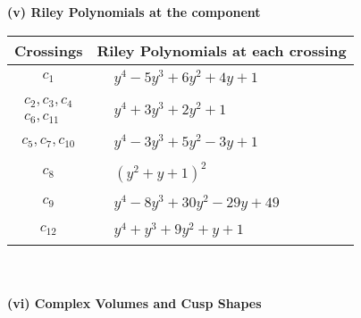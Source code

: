 \documentclass[1p]{elsarticle_modified}
\theoremstyle{definition}
\begin{document}
\newpage\renewcommand{\arraystretch}{1}
\flushleft \textbf{(v) Riley Polynomials at the component}\newline \\
\begin{tabular}{m{50pt}|m{274pt}}
Crossings & \hspace{64pt}Riley Polynomials at each crossing \\
\hline $$\begin{aligned}c_{1}\end{aligned}$$&$\begin{aligned}
&y^4-5 y^3+6 y^2+4 y+1
\end{aligned}$\\
\hline $$\begin{aligned}c_{2},c_{3},c_{4}\\c_{6},c_{11}\end{aligned}$$&$\begin{aligned}
&y^4+3 y^3+2 y^2+1
\end{aligned}$\\
\hline $$\begin{aligned}c_{5},c_{7},c_{10}\end{aligned}$$&$\begin{aligned}
&y^4-3 y^3+5 y^2-3 y+1
\end{aligned}$\\
\hline $$\begin{aligned}c_{8}\end{aligned}$$&$\begin{aligned}
&(y^2+y+1)^2
\end{aligned}$\\
\hline $$\begin{aligned}c_{9}\end{aligned}$$&$\begin{aligned}
&y^4-8 y^3+30 y^2-29 y+49
\end{aligned}$\\
\hline $$\begin{aligned}c_{12}\end{aligned}$$&$\begin{aligned}
&y^4+y^3+9 y^2+y+1
\end{aligned}$\\
\hline
\end{tabular}\\~\\
\newpage\flushleft \textbf{(vi) Complex Volumes and Cusp Shapes}
\end{document}
